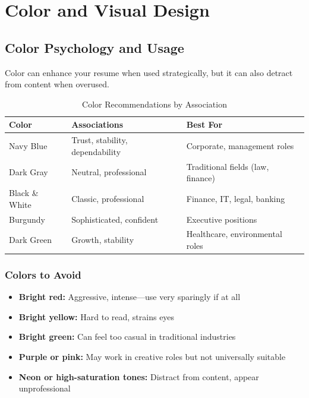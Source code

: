 \documentclass[11pt,a4paper]{article}
\begin{document}
\section{Color and Visual Design}

\subsection{Color Psychology and Usage}

Color can enhance your resume when used strategically, but it can also detract from content when overused.

\begin{table}[h]
\centering
\begin{tabular}{@{}lll@{}}
\toprule
\textbf{Color} & \textbf{Associations} & \textbf{Best For} \\
\midrule
Navy Blue & Trust, stability, dependability & Corporate, management roles \\
Dark Gray & Neutral, professional & Traditional fields (law, finance) \\
Black \& White & Classic, professional & Finance, IT, legal, banking \\
Burgundy & Sophisticated, confident & Executive positions \\
Dark Green & Growth, stability & Healthcare, environmental roles \\
\bottomrule
\end{tabular}
\caption{Color Recommendations by Association}
\end{table}

\subsubsection{Colors to Avoid}

\begin{warning}
\begin{itemize}[noitemsep]
    \item \textbf{Bright red:} Aggressive, intense---use very sparingly if at all
    \item \textbf{Bright yellow:} Hard to read, strains eyes
    \item \textbf{Bright green:} Can feel too casual in traditional industries
    \item \textbf{Purple or pink:} May work in creative roles but not universally suitable
    \item \textbf{Neon or high-saturation tones:} Distract from content, appear unprofessional
\end{itemize}
\end{warning}
\end{document}
